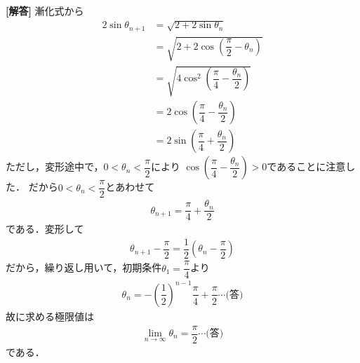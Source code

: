 \documentclass[../../main.tex]{subfiles}
\begin{document}
\begin{oframed}
  
\end{oframed}

{\bf [解答]} 漸化式から
\begin{align}
  2\sin \theta_{n+1}&=\sqrt{2+2\sin \theta_n} \\
  &=\sqrt{2+2\cos \left(\dfrac{\pi}{2}-\theta_n\right)} \\
  &=\sqrt{4\cos^2\left(\dfrac{\pi}{4}-\dfrac{\theta_n}{2}\right)} \\
  &=2\cos\left(\dfrac{\pi}{4}-\dfrac{\theta_n}{2}\right) \\
  &=2\sin\left(\dfrac{\pi}{4}+\dfrac{\theta_n}{2}\right)
\end{align}
ただし，変形途中で，$0<\theta_n<\dfrac{\pi}{2}$により
$\cos\left(\dfrac{\pi}{4}-\dfrac{\theta_n}{2}\right)>0$であることに注意した．
だから$0<\theta_n<\dfrac{\pi}{2}$とあわせて
\begin{align}
  \theta_{n+1}=\dfrac{\pi}{4}+\dfrac{\theta_n}{2}
\end{align}
である．変形して
\begin{align}
  \theta_{n+1}-\dfrac{\pi}{2}=\dfrac{1}{2}\left(\theta_n-\dfrac{\pi}{2}\right)
\end{align}
だから，繰り返し用いて，初期条件$\theta_1=\dfrac{\pi}{4}$より
\begin{align}
  \theta_n=-\left(\dfrac{1}{2}\right)^{n-1}\dfrac{\pi}{4}+\dfrac{\pi}{2} \cdots\text{(答)}
\end{align}
故に求める極限値は
\begin{align}
  \lim_{n\to\infty}\theta_n=\dfrac{\pi}{2} \cdots\text{(答)}
\end{align}
である．

\newpage
\end{document}
